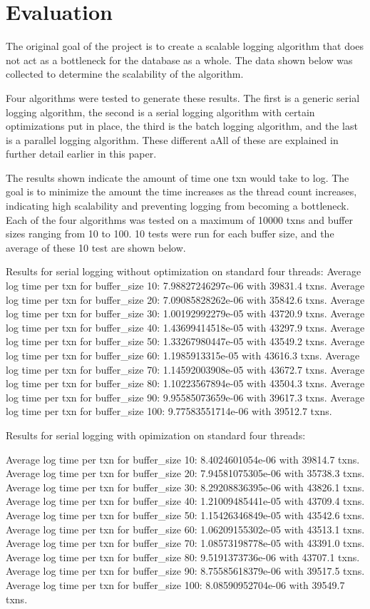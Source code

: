\section{Evaluation}


The original goal of the project is to create a scalable logging algorithm that does not act as a bottleneck for the database as a whole. The data shown below was collected to determine the scalability of the algorithm. 

Four algorithms were tested to generate these results. The first is a generic serial logging algorithm, the second is a serial logging algorithm with certain optimizations put in place, the third is the batch logging algorithm, and the last is a parallel logging algorithm. These different aAll of these are explained in further detail earlier in this paper. \newline

The results shown indicate the amount of time one txn would take to log. The goal is to minimize the amount the time increases as the thread count increases, indicating high scalability and preventing logging from becoming a bottleneck. Each of the four algorithms was tested on a maximum of 10000 txns and buffer sizes ranging from 10 to 100. 10 tests were run for each buffer size, and the average of these 10 test are shown below. \newline 

Results for serial logging without optimization on standard four threads:
Average log time per txn for buffer_size 10: 7.98827246297e-06 with 39831.4 txns.
Average log time per txn for buffer_size 20: 7.09085828262e-06 with 35842.6 txns.
Average log time per txn for buffer_size 30: 1.00192992279e-05 with 43720.9 txns.
Average log time per txn for buffer_size 40: 1.43699414518e-05 with 43297.9 txns.
Average log time per txn for buffer_size 50: 1.33267980447e-05 with 43549.2 txns.
Average log time per txn for buffer_size 60: 1.1985913315e-05 with 43616.3 txns.
Average log time per txn for buffer_size 70: 1.14592003908e-05 with 43672.7 txns.
Average log time per txn for buffer_size 80: 1.10223567894e-05 with 43504.3 txns.
Average log time per txn for buffer_size 90: 9.95585073659e-06 with 39617.3 txns.
Average log time per txn for buffer_size 100: 9.77583551714e-06 with 39512.7 txns.


Results for serial logging with opimization on standard four threads:


Average log time per txn for buffer_size 10: 8.4024601054e-06 with 39814.7 txns.
Average log time per txn for buffer_size 20: 7.94581075305e-06 with 35738.3 txns.
Average log time per txn for buffer_size 30: 8.29208836395e-06 with 43826.1 txns.
Average log time per txn for buffer_size 40: 1.21009485441e-05 with 43709.4 txns.
Average log time per txn for buffer_size 50: 1.15426346849e-05 with 43542.6 txns.
Average log time per txn for buffer_size 60: 1.06209155302e-05 with 43513.1 txns.
Average log time per txn for buffer_size 70: 1.08573198778e-05 with 43391.0 txns.
Average log time per txn for buffer_size 80: 9.5191373736e-06 with 43707.1 txns.
Average log time per txn for buffer_size 90: 8.75585618379e-06 with 39517.5 txns.
Average log time per txn for buffer_size 100: 8.08590952704e-06 with 39549.7 txns.

